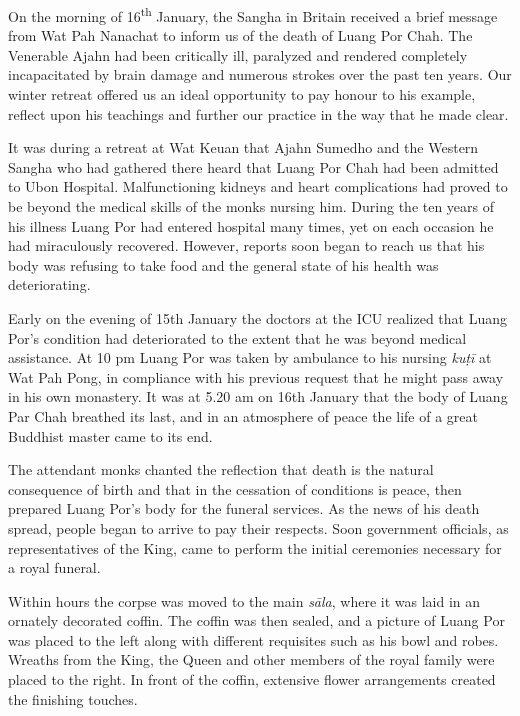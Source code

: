 
On the morning of 16\textsuperscript{th} January, the Sangha in Britain received a brief
message from Wat Pah Nanachat to inform us of the death of Luang Por
Chah. The Venerable Ajahn had been critically ill, paralyzed and
rendered completely incapacitated by brain damage and numerous strokes
over the past ten years. Our winter retreat offered us an ideal
opportunity to pay honour to his example, reflect upon his teachings and
further our practice in the way that he made clear. 

It was during a retreat at Wat Keuan that Ajahn Sumedho and the
Western Sangha who had gathered there heard that Luang Por Chah had been
admitted to Ubon Hospital. Malfunctioning kidneys and heart
complications had proved to be beyond the medical skills of the monks
nursing him. During the ten years of his illness Luang Por had entered
hospital many times, yet on each occasion he had miraculously recovered. 
However, reports soon began to reach us that his body was refusing to
take food and the general state of his health was deteriorating. 

Early on the evening of 15th January the doctors at the ICU realized
that Luang Por's condition had deteriorated to the extent that he was
beyond medical assistance. At 10 pm Luang Por was taken by ambulance to
his nursing \emph{kuṭī} at Wat Pah Pong, in compliance with his previous
request that he might pass away in his own monastery. It was at 5.20 am
on 16th January that the body of Luang Par Chah breathed its last, and
in an atmosphere of peace the life of a great Buddhist master came to
its end. 

The attendant monks chanted the reflection that death is the natural
consequence of birth and that in the cessation of conditions is peace, 
then prepared Luang Por's body for the funeral services. As the news of
his death spread, people began to arrive to pay their respects. Soon
government officials, as representatives of the King, came to perform
the initial ceremonies necessary for a royal funeral. 

Within hours the corpse was moved to the main \emph{sāla}, where it was
laid in an ornately decorated coffin. The coffin was then sealed, and a
picture of Luang Por was placed to the left along with different
requisites such as his bowl and robes. Wreaths from the King, the Queen
and other members of the royal family were placed to the right. In front
of the coffin, extensive flower arrangements created the finishing
touches. 

